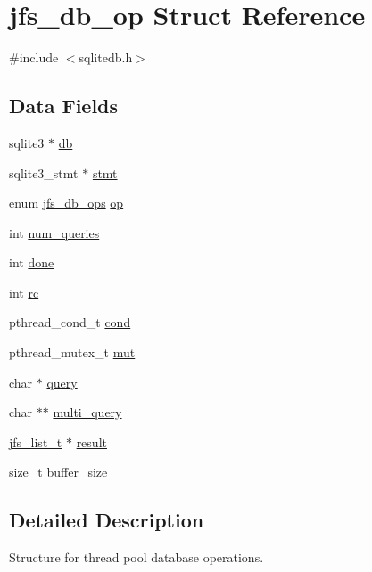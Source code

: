 \hypertarget{structjfs__db__op}{
\section{jfs\_\-db\_\-op Struct Reference}
\label{structjfs__db__op}
}


{\ttfamily \#include $<$sqlitedb.h$>$}

\subsection*{Data Fields}
\begin{DoxyCompactItemize}
\item 
sqlite3 $\ast$ \hyperlink{structjfs__db__op_a8547f4c79a291d7c581c64c2eb0e83ba}{db}
\item 
sqlite3\_\-stmt $\ast$ \hyperlink{structjfs__db__op_a8adbfebee41154f5fbc3be1256255870}{stmt}
\item 
enum \hyperlink{jfs__db__ops_8h_af6bdc4da6fffc70bba9b64b165cac5bc}{jfs\_\-db\_\-ops} \hyperlink{structjfs__db__op_ae69d9d34d24f365b8e77a6a792b32569}{op}
\item 
int \hyperlink{structjfs__db__op_a74baf7d5ec3899edcb1047bd9ea35958}{num\_\-queries}
\item 
int \hyperlink{structjfs__db__op_a6331deccf4026cf7ba1738c6e28c2f7a}{done}
\item 
int \hyperlink{structjfs__db__op_a4364863dc28a00f88281e69331a97874}{rc}
\item 
pthread\_\-cond\_\-t \hyperlink{structjfs__db__op_adec1c36c799aec505c76ab0efc41ab5a}{cond}
\item 
pthread\_\-mutex\_\-t \hyperlink{structjfs__db__op_a21b64755a11fa95a1739c42b0243ffa0}{mut}
\item 
char $\ast$ \hyperlink{structjfs__db__op_acf46a873006bb123d601b6a6914c58a6}{query}
\item 
char $\ast$$\ast$ \hyperlink{structjfs__db__op_a2b4f1fe422fb750b7ee7470d186f0110}{multi\_\-query}
\item 
\hyperlink{structjfs__list}{jfs\_\-list\_\-t} $\ast$ \hyperlink{structjfs__db__op_afbeb729afc20ba8e671ab03a7a7ee864}{result}
\item 
size\_\-t \hyperlink{structjfs__db__op_a641b456e4e88432ddd4b59bdf75d43bd}{buffer\_\-size}
\end{DoxyCompactItemize}


\subsection{Detailed Description}
Structure for thread pool database operations.

